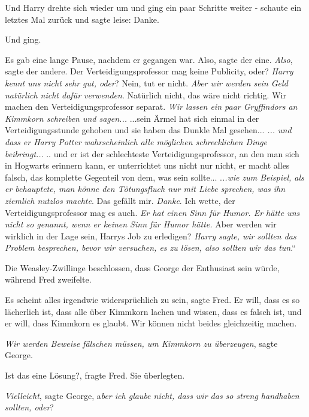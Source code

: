 Und Harry drehte sich wieder um und ging ein paar Schritte weiter - schaute ein
letztes Mal zurück und sagte leise: \glqq Danke.\grqq{}

Und ging.

Es gab eine lange Pause, nachdem er gegangen war. \glqq Also\grqq{}, sagte der
eine. \glqq \emph{Also}\grqq{}, sagte der andere. \glqq Der
Verteidigungsprofessor mag keine Publicity, oder?\grqq{} \glqq \emph{Harry kennt
uns nicht sehr gut, oder}?\grqq{} \glqq Nein, tut er nicht.\grqq{} \glqq
\emph{Aber wir werden sein Geld natürlich nicht dafür verwenden}.\grqq{} \glqq
Natürlich nicht, das wäre nicht richtig. Wir machen den Verteidigungsprofessor
separat.\grqq{} \glqq \emph{Wir lassen ein paar Gryffindors an Kimmkorn
schreiben und sagen...}\grqq{} \glqq ...sein Ärmel hat sich einmal in der
Verteidigungsstunde gehoben und sie haben das Dunkle Mal gesehen...\grqq{} \glqq
\emph{... und dass er Harry Potter wahrscheinlich alle möglichen schrecklichen
Dinge }\emph{beibringt..}.\grqq{} \glqq .. und er ist der schlechteste
Verteidigungsprofessor, an den man sich in Hogwarts erinnern kann, er
unterrichtet uns nicht nur nicht, er macht alles falsch, das komplette Gegenteil
von dem, was sein sollte...\grqq{} \glqq .\emph{..wie zum Beispiel, als er
behauptete, man könne den Tötungsfluch nur mit Liebe sprechen, was ihn ziemlich
nutzlos machte}.\grqq{} \glqq Das gefällt mir.\grqq{} \glqq \emph{Danke}.\grqq{}
\glqq Ich wette, der Verteidigungsprofessor mag es auch.\grqq{} \glqq \emph{Er
hat einen Sinn für Humor. Er hätte uns nicht so genannt, wenn er keinen Sinn für
Humor hätte.}\grqq{} \glqq Aber werden wir wirklich in der Lage sein, Harrys Job
zu erledigen?\grqq{} \glqq \emph{Harry sagte, wir sollten das Problem
besprechen, bevor wir versuchen, es zu lösen, also sollten wir das tun}.“

Die Weasley-Zwillinge beschlossen, dass George der Enthusiast sein würde,
während Fred zweifelte.

\glqq Es scheint alles irgendwie widersprüchlich zu sein\grqq{}, sagte Fred.
\glqq Er will, dass es so lächerlich ist, dass alle über Kimmkorn lachen und
wissen, dass es falsch ist, und er will, dass Kimmkorn es glaubt. Wir können
nicht beides gleichzeitig machen.\grqq{}

\glqq \emph{Wir werden Beweise fälschen müssen, um Kimmkorn zu
überzeugen}\grqq{}, sagte George.

\glqq Ist das eine Lösung?\grqq{}, fragte Fred. Sie überlegten.

\glqq \emph{Vielleicht}\grqq{}, sagte George, \glqq a\emph{ber ich glaube nicht,
dass wir das so streng handhaben sollten, oder}?\grqq{}

